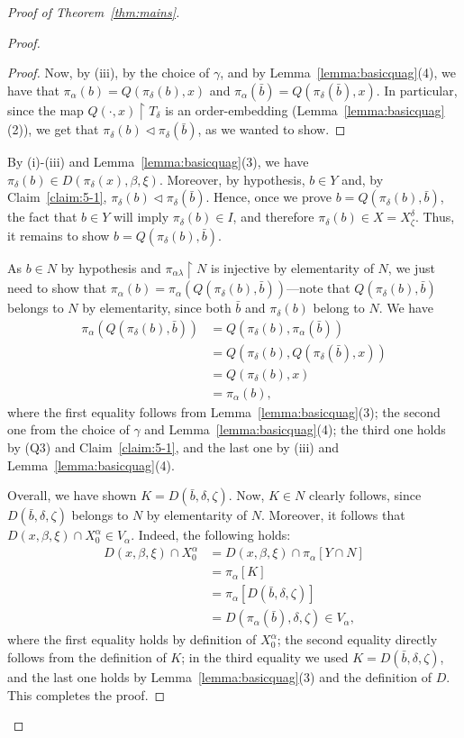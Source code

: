 \documentclass[]{amsart}
\theoremstyle{definition}
\theoremstyle{remark}
\begin{document}
\begin{proof}[Proof of Theorem~\ref{thm:mains}]
\begin{proof}
\begin{proof}
Now, by (iii), by the choice of $\gamma$, and by Lemma~\ref{lemma:basicquag}(4), we have that $\pi_\alpha(b) = Q(\pi_\delta(b), x)$ and $\pi_\alpha(\bar{b}) = Q(\pi_\delta(\bar{b}), x)$. In particular, since the map $Q(\cdot, x) \upharpoonright T_\delta$ is an order-embedding  (Lemma~\ref{lemma:basicquag}(2)), we get that $\pi_\delta(b) \lhd \pi_\delta(\bar{b})$, as we wanted to show.
\end{proof}

By (i)-(iii) and Lemma~\ref{lemma:basicquag}(3), we have $\pi_\delta(b) \in D(\pi_\delta(x), \beta, \xi)$. Moreover, by hypothesis, $b \in Y$ and, by Claim~\ref{claim:5-1}, $\pi_\delta(b) \lhd \pi_\delta(\bar{b})$. Hence, once we prove $b = Q(\pi_\delta(b), \bar{b})$, the fact that $b \in Y$ will imply $\pi_\delta(b) \in I$, and therefore $\pi_\delta(b) \in X = X^\delta_\zeta$. Thus, it remains to show $b = Q(\pi_\delta(b), \bar{b})$. 

As $b \in N$ by hypothesis and $\pi_{\alpha \lambda} \upharpoonright N$ is injective by elementarity of $N$, we just need to show that $\pi_\alpha(b) = \pi_\alpha(Q(\pi_\delta(b), \bar{b}))$---note that $Q(\pi_\delta(b), \bar{b})$ belongs to $N$ by elementarity, since both $\bar{b}$ and $\pi_\delta(b)$ belong to $N$. We have
\begin{align*}
\pi_\alpha(Q(\pi_\delta(b), \bar{b})) &= Q(\pi_\delta(b), \pi_\alpha(\bar{b}))\\&= Q(\pi_\delta(b), Q(\pi_\delta(\bar{b}), x)) \\&= Q(\pi_\delta(b), x) \\&= \pi_\alpha(b),
\end{align*}
where the first equality follows from Lemma~\ref{lemma:basicquag}(3); the second one from the choice of $\gamma$ and Lemma~\ref{lemma:basicquag}(4); the third one holds by (Q3) and Claim~\ref{claim:5-1}, and the last one by (iii) and Lemma~\ref{lemma:basicquag}(4). 

Overall, we have shown $K = D(\bar{b}, \delta, \zeta)$. Now, $K \in N$ clearly follows, since $D(\bar{b}, \delta, \zeta)$ belongs to $N$ by elementarity of $N$.  Moreover, it follows that $D(x, \beta, \xi) \cap X^\alpha_0 \in V_\alpha$. Indeed, the following holds:
\begin{align*}
D(x, \beta, \xi) \cap X^\alpha_0 &= D(x, \beta, \xi) \cap \pi_\alpha[Y \cap N]\\&= \pi_\alpha[K]\\&= \pi_\alpha[D(\bar{b}, \delta , \zeta)] \\&= D(\pi_\alpha(\bar{b}), \delta, \zeta) \in V_\alpha,
\end{align*} 
where the first equality holds by definition of $X^\alpha_0$; the second equality directly follows from the definition of $K$; in the third equality we used $K = D(\bar{b}, \delta, \zeta)$, and the last one holds by Lemma~\ref{lemma:basicquag}(3) and the definition of $D$. This completes the proof.
\end{proof}









\end{proof}
\end{document}
